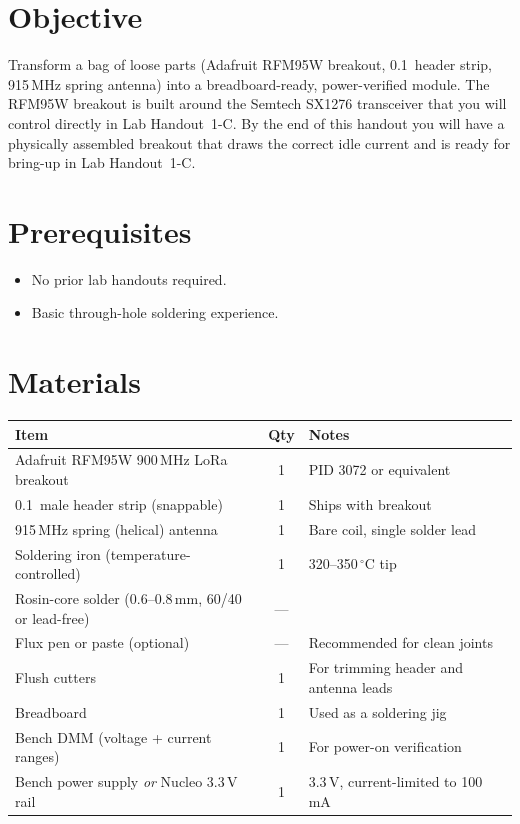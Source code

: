 \documentclass[11pt,letterpaper]{article}
\begin{document}

\section{Objective}
Transform a bag of loose parts (Adafruit RFM95W breakout, 0.1\,\textquotedbl{} header strip, 915\,MHz spring antenna) into a breadboard-ready, power-verified \RF{} module. The RFM95W breakout is built around the Semtech SX1276 transceiver that you will control directly in Lab Handout~1-C. By the end of this handout you will have a physically assembled breakout that draws the correct idle current and is ready for \SPI{} bring-up in Lab Handout~1-C.

\section{Prerequisites}
\begin{itemize}[leftmargin=2em]
	\item No prior lab handouts required.
	\item Basic through-hole soldering experience.
\end{itemize}

\section{Materials}
\begin{table}[h!]
	\centering
	\begin{tabular}{l c l}
		\toprule
		\textbf{Item} & \textbf{Qty} & \textbf{Notes} \\
		\midrule
		Adafruit RFM95W 900\,MHz LoRa breakout & 1 & PID 3072 or equivalent \\
		0.1\,\textquotedbl{} male header strip (snappable) & 1 & Ships with breakout \\
		915\,MHz spring (helical) antenna & 1 & Bare coil, single solder lead \\
		Soldering iron (temperature-controlled) & 1 & 320--350\,$^\circ$C tip \\
		Rosin-core solder (0.6--0.8\,mm, 60/40 or lead-free) & --- & \\
		Flux pen or paste (optional) & --- & Recommended for clean joints \\
		Flush cutters & 1 & For trimming header and antenna leads \\
		Breadboard & 1 & Used as a soldering jig \\
		Bench \mbox{DMM} (voltage + current ranges) & 1 & For power-on verification \\
		Bench power supply \textit{or} Nucleo 3.3\,V rail & 1 & 3.3\,V, current-limited to 100\,mA \\
		\bottomrule
	\end{tabular}
\end{table}
\end{document}
